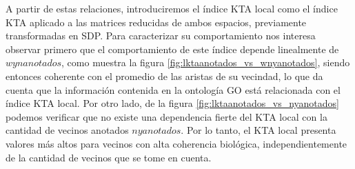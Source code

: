 A partir de estas relaciones, introduciremos el índice KTA local como el índice KTA aplicado a las matrices reducidas de ambos espacios, previamente transformadas en SDP. Para caracterizar su comportamiento nos interesa observar primero que el comportamiento de este índice depende linealmente de $wynanotados$, como muestra la figura \ref{fig:lktaanotados_vs_wnyanotados}, siendo entonces coherente con el promedio de las aristas de su vecindad, lo que da cuenta que la información contenida en la ontología GO está relacionada con el índice KTA local. Por otro lado, de la figura \ref{fig:lktaanotados_vs_nyanotados} podemos verificar que no existe una dependencia fierte del KTA local con la cantidad de vecinos anotados $nyanotados$. Por lo tanto, el KTA local presenta valores más altos para vecinos con alta coherencia biológica, independientemente de la cantidad de vecinos que se tome en cuenta.

